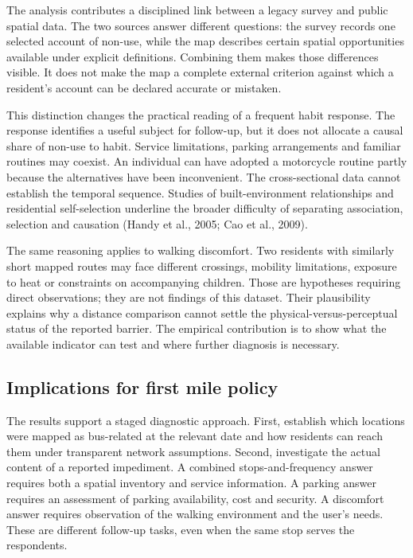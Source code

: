 \documentclass[
  11pt,
  a4paper,
]{article}
\begin{document}
The analysis contributes a disciplined link between a legacy survey and
public spatial data. The two sources answer different questions: the
survey records one selected account of non-use, while the map describes
certain spatial opportunities available under explicit definitions.
Combining them makes those differences visible. It does not make the map
a complete external criterion against which a resident's account can be
declared accurate or mistaken.

This distinction changes the practical reading of a frequent habit
response. The response identifies a useful subject for follow-up, but it
does not allocate a causal share of non-use to habit. Service
limitations, parking arrangements and familiar routines may coexist. An
individual can have adopted a motorcycle routine partly because the
alternatives have been inconvenient. The cross-sectional data cannot
establish the temporal sequence. Studies of built-environment
relationships and residential self-selection underline the broader
difficulty of separating association, selection and causation (Handy et
al., 2005; Cao et al., 2009).

The same reasoning applies to walking discomfort. Two residents with
similarly short mapped routes may face different crossings, mobility
limitations, exposure to heat or constraints on accompanying children.
Those are hypotheses requiring direct observations; they are not
findings of this dataset. Their plausibility explains why a distance
comparison cannot settle the physical-versus-perceptual status of the
reported barrier. The empirical contribution is to show what the
available indicator can test and where further diagnosis is necessary.

\subsection{Implications for first mile
policy}\label{implications-for-first-mile-policy}

The results support a staged diagnostic approach. First, establish which
locations were mapped as bus-related at the relevant date and how
residents can reach them under transparent network assumptions. Second,
investigate the actual content of a reported impediment. A combined
stops-and-frequency answer requires both a spatial inventory and service
information. A parking answer requires an assessment of parking
availability, cost and security. A discomfort answer requires
observation of the walking environment and the user's needs. These are
different follow-up tasks, even when the same stop serves the
respondents.
\end{document}
